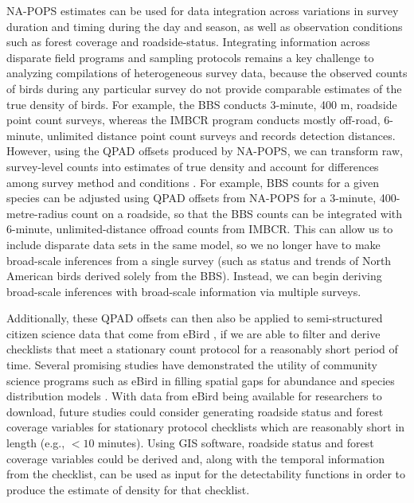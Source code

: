 \par NA-POPS estimates can be used for data integration across variations in survey duration and timing during the day and season, as well as observation conditions such as forest coverage and roadside-status.
Integrating information across disparate field programs and sampling protocols remains a key challenge to analyzing compilations of heterogeneous survey data, because the observed counts of birds during any particular survey do not provide comparable estimates of the true density of birds.
For example, the BBS conducts 3-minute, 400 m, roadside point count surveys, whereas the IMBCR program conducts mostly off-road, 6-minute, unlimited distance point count surveys and records detection distances.
However, using the QPAD offsets produced by NA-POPS, we can transform raw, survey-level counts into estimates of true density and account for differences among survey method and conditions \citep{stralberg_projecting_2015, solymos_lessons_2020}.
For example, BBS counts for a given species can be adjusted using QPAD offsets from NA-POPS for a 3-minute, 400-metre-radius count on a roadside, so that the BBS counts can be integrated with 6-minute, unlimited-distance offroad counts from IMBCR.
This can allow us to include disparate data sets in the same model, so we no longer have to make broad-scale inferences from a single survey (such as status and trends of North American birds derived solely from the BBS). Instead, we can begin deriving broad-scale inferences with broad-scale information via multiple surveys. 

\par Additionally, these QPAD offsets can then also be applied to semi-structured citizen science data that come from eBird \citep{sullivan_ebird_2014}, if we are able to filter and derive checklists that meet a stationary count protocol for a reasonably short period of time.
Several promising studies have demonstrated the utility of community science programs such as eBird in filling spatial gaps for abundance and species distribution models \citep{pacifici_integrating_2017, robinson_integrating_2020, joseph_data_2021}.
With data from eBird being available for researchers to download, future studies could consider generating roadside status and forest coverage variables for stationary protocol checklists which are reasonably short in length (e.g., $< 10$ minutes).
Using GIS software, roadside status and forest coverage variables could be derived and, along with the temporal information from the checklist, can be used as input for the detectability functions in order to produce the estimate of density for that checklist. 


